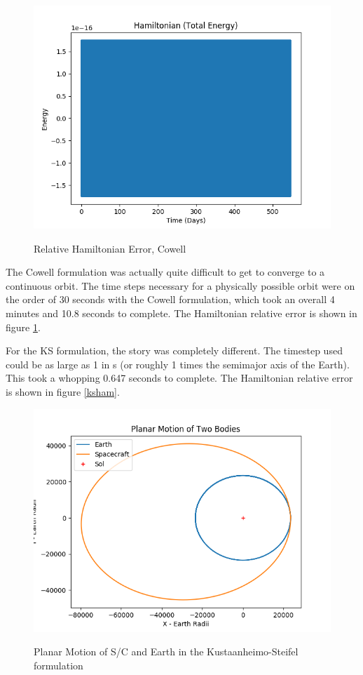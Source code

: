 \documentclass[11pt,twoside,letterpaper]{article}
\begin{document}
  \begin{figure}
    \caption{Relative Hamiltonian Error, Cowell}
    \centering
    \includegraphics[width=\textwidth]{Hamiltonian90}
    \label{cowHam}
  \end{figure}
  
  The Cowell formulation was actually quite difficult to get to
  converge to a continuous orbit. The time steps necessary for a
  physically possible orbit were on the order of 30 seconds with the
  Cowell formulation, which took an overall 4 minutes and 10.8 seconds
  to complete. The Hamiltonian relative error is shown in figure
  \ref{cowHam}.

  For the KS formulation, the story was completely different. The
  timestep used could be as large as 1 in s (or roughly 1 times the
  semimajor axis of the Earth). This took a whopping 0.647 seconds to
  complete. The Hamiltonian relative error is shown in figure
  \ref{ksham}.

  \begin{figure}
    \caption{Planar Motion of S/C and Earth in the Kustaanheimo-Steifel formulation}
    \centering
    \includegraphics[width=\textwidth]{PlanarPathKS}
    \label{kspath}
  \end{figure}
\end{document}
